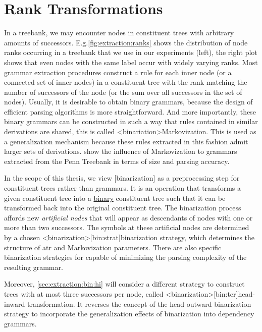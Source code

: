 \documentclass[../../document.tex]{subfiles}
\begin{document}
    \section{Rank Transformations}
    In a treebank, we may encounter nodes in constituent trees with arbitrary amounts of successors.
    E.g.\@ \cref{fig:extraction:ranks} shows the distribution of node ranks occurring in a treebank that we use in our experiments (left), the right plot shows that even nodes with the same label occur with widely varying ranks.
    Most grammar extraction procedures construct a rule for each inner node (or a connected set of inner nodes) in a constituent tree with the rank matching the number of successors of the node (or the sum over all successors in the set of nodes).
    Usually, it is desirable to obtain binary grammars, because the design of efficient parsing algorithms is more straightforward.
    And more importantly, these binary grammars can be constructed in such a way that rules contained in similar derivations are shared, this is called <binariation>{Markovization}.
    This is used as a generalization mechanism because these rules extracted in this fashion admit larger sets of derivations.
    \citet[figure 2]{KleMan03} show the influence of Markovization to grammars extracted from the Penn Treebank in terms of size and parsing accuracy.

    In the scope of this thesis, we view [binarization] as a preprocessing step for constituent trees rather than grammars.
    It is an operation that transforms a given constituent tree into a \hyperlink{binctree}{binary} constituent tree such that it can be transformed back into the original constituent tree.
    The binarization process affords new \emph{artificial nodes} that will appear as descendants of nodes with one or more than two successors.
    The symbols at these artificial nodes are determined by a chosen <binarization>[bin:strat]{binarization strategy}, which determines the structure of atr and Markovization parameters. \citep{Son08,Cra12}
    There are also specific binarization strategies for  capable of minimizing the parsing complexity of the resulting grammar. \citep{Gil10}

    Moreover, \cref{sec:extraction:bin:hi} will consider a different strategy to construct trees with at most three successors per node, called <binarization>[bin:ter]{head-inward transformation}.
    It reverses the concept of the head-outward binarization strategy to incorporate the generalization effects of binarization into dependency grammars.
\end{document}

